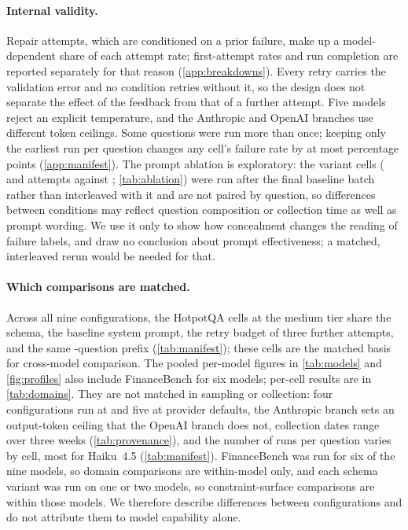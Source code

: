 \paragraph{Internal validity.}
Repair attempts, which are conditioned on a prior failure, make up a
model-dependent share of each attempt rate; first-attempt rates and run
completion are reported separately for that reason
(\cref{app:breakdowns}). Every retry carries the validation error and no
condition retries without it, so the design does not separate the effect
of the feedback from that of a further attempt. Five models reject an
explicit temperature, and the Anthropic and OpenAI branches use
different token ceilings. Some questions were run more than once; keeping
only the earliest run per question changes any cell's failure rate by at
most  percentage points
(\cref{app:manifest}). The prompt ablation is exploratory: the variant
cells ( and 
attempts against ; \cref{tab:ablation}) were
run after the final baseline batch
rather than interleaved with it and are not paired by question, so
differences between conditions may reflect question composition or
collection time as well as prompt wording. We use it only to show how
concealment changes the reading of failure labels, and draw no conclusion
about prompt effectiveness; a matched, interleaved rerun would be needed
for that.

\paragraph{Which comparisons are matched.}
Across all nine configurations, the HotpotQA cells at the medium tier
share the schema, the baseline system prompt, the retry budget of three
further attempts, and the same
-question prefix (\cref{tab:manifest});
these cells are the matched basis for cross-model comparison. The
pooled per-model figures in \cref{tab:models} and \cref{fig:profiles}
also include FinanceBench for six models; per-cell results are in
\cref{tab:domains}. They are not matched in sampling or collection: four
configurations run at  and five at provider
defaults, the Anthropic branch sets an output-token ceiling that the
OpenAI branch does not, collection dates range over three weeks
(\cref{tab:provenance}), and the number of runs per question varies by
cell, most for Haiku~4.5 (\cref{tab:manifest}). FinanceBench was
run for six of the nine models, so domain comparisons are within-model
only, and each schema variant was run on one or two models, so
constraint-surface comparisons are within those models. We therefore
describe differences between configurations and do not attribute them to
model capability alone.

